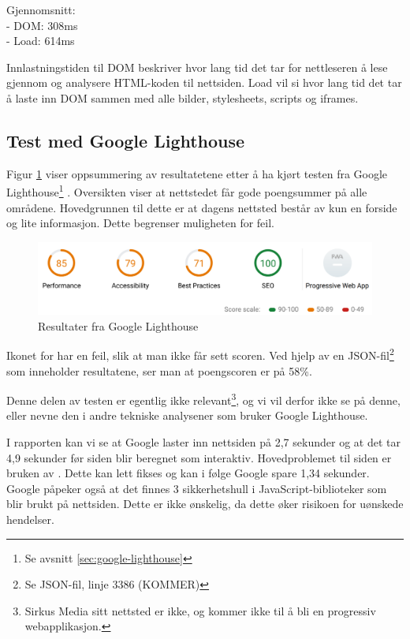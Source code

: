 Gjennomsnitt:\\
- DOM: 308ms\\
- Load: 614ms

Innlastningstiden til DOM beskriver hvor lang tid det tar for nettleseren å lese gjennom og analysere HTML-koden til nettsiden. Load vil si hvor lang tid det tar å laste inn DOM sammen med alle bilder, stylesheets, scripts og iframes.

\subsection{Test med Google Lighthouse}
\label{sec:analysis-current-lighthouse}

 Figur \ref{fig:analysis-current-lightouse-summary} viser oppsummering av resultatetene etter å ha kjørt testen fra Google Lighthouse\footnote{Se avsnitt \ref{sec:google-lighthouse}} . Oversikten viser at nettstedet får gode poengsummer på alle områdene. Hovedgrunnen til dette er at dagens nettsted består av kun en forside og lite informasjon. Dette begrenser muligheten for feil.

\begin{figure}[H]
    \centering
    \includegraphics[width=\textwidth]{bjornar/Lighthouse-Report-mobile.png}
    \caption{Resultater fra Google Lighthouse}
    \label{fig:analysis-current-lightouse-summary}
\end{figure}

Ikonet for  har en feil, slik at man ikke får sett scoren. Ved hjelp av en JSON-fil\footnote{Se JSON-fil, linje 3386 (KOMMER)} som inneholder resultatene, ser man at poengscoren er på 58\%.

Denne delen av testen er egentlig ikke relevant\footnote{Sirkus Media sitt nettsted er ikke, og kommer ikke til å bli en progressiv webapplikasjon.}, og vi vil derfor ikke se på denne, eller nevne den i andre tekniske analysener som bruker Google Lighthouse.

I rapporten kan vi se at Google laster inn nettsiden på 2,7 sekunder og at det tar 4,9 sekunder før siden blir beregnet som interaktiv. Hovedproblemet til siden er bruken av . Dette kan lett fikses og kan i følge Google spare 1,34 sekunder. Google påpeker også at det finnes 3 sikkerhetshull i JavaScript-biblioteker som blir brukt på nettsiden. Dette er ikke ønskelig, da dette øker risikoen for uønskede hendelser.

